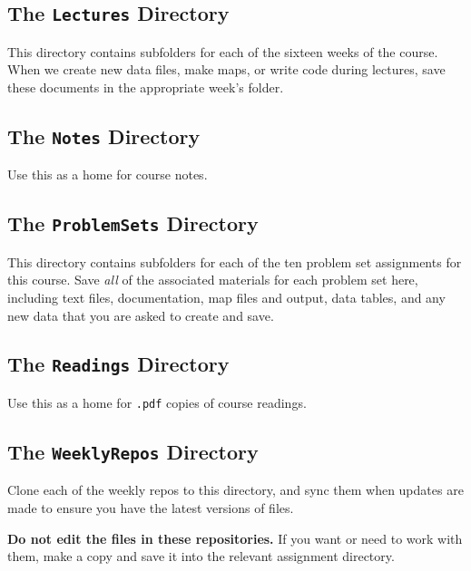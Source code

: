 \documentclass[]{book}
\theoremstyle{definition}
\theoremstyle{definition}
\theoremstyle{definition}
\theoremstyle{remark}
\begin{document}
\subsection{\texorpdfstring{The \texttt{Lectures}
Directory}{The Lectures Directory}}\label{the-lectures-directory}

This directory contains subfolders for each of the sixteen weeks of the
course. When we create new data files, make maps, or write code during
lectures, save these documents in the appropriate week's folder.

\subsection{\texorpdfstring{The \texttt{Notes}
Directory}{The Notes Directory}}\label{the-notes-directory}

Use this as a home for course notes.

\subsection{\texorpdfstring{The \texttt{ProblemSets}
Directory}{The ProblemSets Directory}}\label{the-problemsets-directory}

This directory contains subfolders for each of the ten problem set
assignments for this course. Save \emph{all} of the associated materials
for each problem set here, including text files, documentation, map
files and output, data tables, and any new data that you are asked to
create and save.

\subsection{\texorpdfstring{The \texttt{Readings}
Directory}{The Readings Directory}}\label{the-readings-directory}

Use this as a home for \texttt{.pdf} copies of course readings.

\subsection{\texorpdfstring{The \texttt{WeeklyRepos}
Directory}{The WeeklyRepos Directory}}\label{the-weeklyrepos-directory}

Clone each of the weekly repos to this directory, and sync them when
updates are made to ensure you have the latest versions of files.

\textbf{Do not edit the files in these repositories.} If you want or
need to work with them, make a copy and save it into the relevant
assignment directory.
\end{document}
